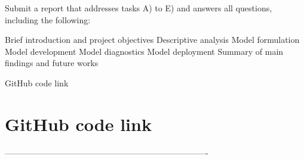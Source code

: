 Submit a report that addresses tasks A) to E) and answers all questions, including the following:

Brief introduction and project objectives
Descriptive analysis
Model formulation
Model development
Model diagnostics
Model deployment
Summary of main findings and future works


GitHub code link

\section{GitHub code link}


-------------------------------------------------------------------------%

\newpage
%
%
%
%



%


